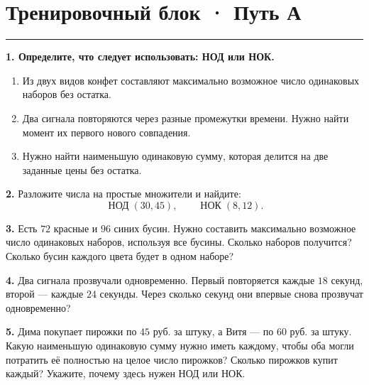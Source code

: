 \documentclass[a4paper,12pt]{article}
\newcommand{\nodru}{\mathop{\text{НОД}}\nolimits}
\newcommand{\nokru}{\mathop{\text{НОК}}\nolimits}
\newcommand{\sectionline}{%
  \vspace{-0.2em}\par\noindent
  {\color{accent}\rule{\linewidth}{0.55pt}}%
  \vspace{0.35em}
}
\begin{document}
\clearpage


\section*{Тренировочный блок · Путь А}
\sectionline

\textbf{1. Определите, что следует использовать: НОД или НОК.}

\begin{enumerate}[label=\alph*),leftmargin=8mm,itemsep=2pt,topsep=2pt]
\item Из двух видов конфет составляют максимально возможное число одинаковых наборов без остатка.
\item Два сигнала повторяются через разные промежутки времени. Нужно найти момент их первого нового совпадения.
\item Нужно найти наименьшую одинаковую сумму, которая делится на две заданные цены без остатка.
\end{enumerate}

\vspace{2mm}

\textbf{2.} Разложите числа на простые множители и найдите:
\[
\nodru(30,45),
\qquad
\nokru(8,12).
\]

\vspace{2mm}

\textbf{3.} Есть \(72\) красные и \(96\) синих бусин. Нужно составить максимально возможное число одинаковых наборов, используя все бусины. Сколько наборов получится? Сколько бусин каждого цвета будет в одном наборе?

\vspace{2mm}

\textbf{4.} Два сигнала прозвучали одновременно. Первый повторяется каждые \(18\) секунд, второй --- каждые \(24\) секунды. Через сколько секунд они впервые снова прозвучат одновременно?

\vspace{2mm}

\textbf{5.} Дима покупает пирожки по \(45\) руб. за штуку, а Витя --- по \(60\) руб. за штуку. Какую наименьшую одинаковую сумму нужно иметь каждому, чтобы оба могли потратить её полностью на целое число пирожков? Сколько пирожков купит каждый? Укажите, почему здесь нужен НОД или НОК.

\vfill
\end{document}
